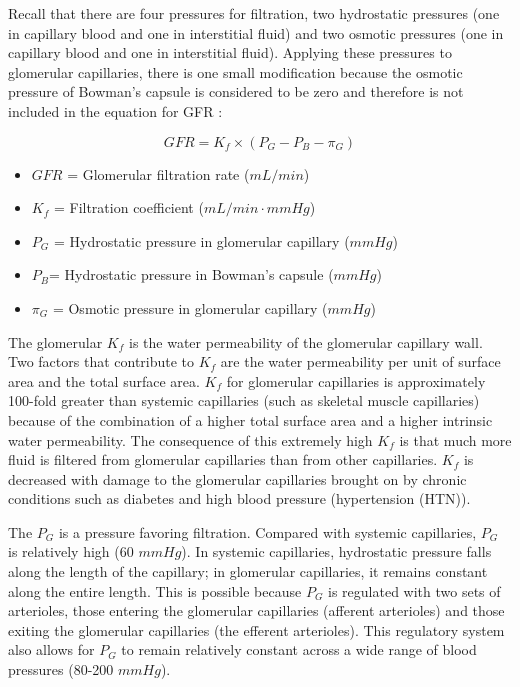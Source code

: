 Recall that there are four pressures for filtration, two hydrostatic pressures (one in capillary blood and one in interstitial fluid) and two osmotic pressures (one in capillary blood and one in interstitial fluid). Applying these pressures to glomerular capillaries, there is one small modification because the osmotic pressure of Bowman’s capsule is considered to be zero and therefore is not included in the equation for GFR \cite{costanzo_physiology_2013}:

\begin{equation}
GFR = K_f \times (P_{G} - P_{B} - \pi_{G})
\label{GFR}
\end{equation}

\begin{itemize}
\item $GFR$ = Glomerular filtration rate ($mL/min$) 
\item $K_f$ = Filtration coefficient ($mL/min \cdot mm Hg$) 
\item $P_{G}$ = Hydrostatic pressure in glomerular capillary ($mm Hg$) 
\item $P_{B} $= Hydrostatic pressure in Bowman’s capsule ($mm Hg$) 
\item $\pi_{G}$ = Osmotic pressure in glomerular capillary ($mm Hg$) 
\end{itemize} 

The glomerular $K_f$  is the water permeability of the glomerular capillary wall. Two factors that contribute to $K_f$ are the water permeability per unit of surface area and the total surface area. $K_f$ for glomerular capillaries is approximately 100-fold greater than systemic capillaries (such as skeletal muscle capillaries) because of the combination of a higher total surface area and a higher intrinsic water permeability. The consequence of this extremely high $K_f$ is that much more fluid is filtered from glomerular capillaries than from other capillaries. $K_f$ is decreased with damage to the glomerular capillaries brought on by chronic conditions such as diabetes and high blood pressure (hypertension (HTN)).

The $P_{G}$ is a pressure favoring filtration.  Compared with systemic capillaries, $P_{G}$ is relatively high (60 $mm Hg$). In systemic capillaries, hydrostatic pressure falls along the length of the capillary; in glomerular capillaries, it remains constant along the entire length. This is possible because $P_{G}$ is regulated with two sets of arterioles, those entering the glomerular capillaries (afferent arterioles) and those exiting the glomerular capillaries (the efferent arterioles). This regulatory system also allows for $P_{G}$  to remain relatively constant across a wide range of blood pressures (80-200 $mm Hg$).

